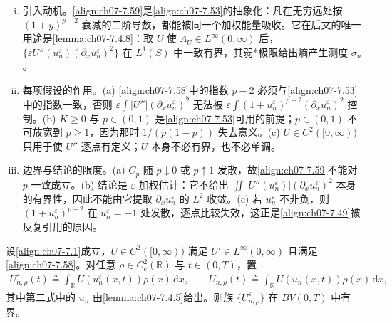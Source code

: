﻿\documentclass[../../main.tex]{subfiles}%
\begin{document}
\begin{remark}\label{remark:ch07-7.4.3能量}
\begin{enumerate}[(i)]
\item 引入动机。\eqref{align:ch07-7.59}是\eqref{align:ch07-7.53}的抽象化：凡在无穷远处按 $(1+y)^{p-2}$ 衰减的二阶导数，都能被同一个加权能量吸收。它在后文的唯一用途是\cref{lemma:ch07-7.4.8}：取 $U$ 使 $\Lambda_U\in L^\infty(0,\infty)$ 后，$\{\varepsilon U''(u_n^\varepsilon)(\partial_xu_n^\varepsilon)^2\}$ 在 $L^1(S)$ 中一致有界，其弱*极限给出熵产生测度 $\sigma_n$。
\item 每项假设的作用。(a) \eqref{align:ch07-7.58}中的指数 $p-2$ 必须与\eqref{align:ch07-7.53}中的指数一致，否则 $\varepsilon\int|U''|(\partial_xu_n^\varepsilon)^2$ 无法被 $\varepsilon\int(1+u_n^\varepsilon)^{p-2}(\partial_xu_n^\varepsilon)^2$ 控制。(b) $K\geqslant0$ 与 $p\in(0,1)$ 是\eqref{align:ch07-7.53}可用的前提；$p\in(0,1)$ 不可放宽到 $p\geqslant1$，因为那时 $1/(p(1-p))$ 失去意义。(c) $U\in C^2([0,\infty))$ 只用于使 $U''$ 逐点有定义；$U$ 本身不必有界，也不必单调。
\item 边界与结论的限度。(a) $C_p$ 随 $p\downarrow0$ 或 $p\uparrow1$ 发散，故\eqref{align:ch07-7.59}不能对 $p$ 一致成立。(b) 结论是 $\varepsilon$ 加权估计：它不给出 $\iint|U''(u_n^\varepsilon)|(\partial_xu_n^\varepsilon)^2$ 本身的有界性，因此不能由它提取 $\partial_xu_n^\varepsilon$ 的 $L^2$ 收敛。(c) 若 $u_n^\varepsilon$ 不非负，则 $(1+u_n^\varepsilon)^{p-2}$ 在 $u_n^\varepsilon=-1$ 处发散，逐点比较失效，这正是\eqref{align:ch07-7.49}被反复引用的原因。
\end{enumerate}
\end{remark}

\begin{lemma}\label{lemma:ch07-7.4.4}
设\eqref{align:ch07-7.1}成立，$U\in C^2([0,\infty))$ 满足 $U'\in L^\infty(0,\infty)$ 且满足\eqref{align:ch07-7.58}。对任意 $\rho\in C^2_c(\mathbb{R})$ 与 $t\in(0,T)$，置
\begin{align}
U_{n,\rho}^\varepsilon(t)\triangleq\int_{\mathbb{R}}U(u_n^\varepsilon(x,t))\rho(x)\,\mathrm{d}x,\qquad
U_{n,\rho}(t)\triangleq\int_{\mathbb{R}}U(u_n(x,t))\rho(x)\,\mathrm{d}x, \label{align:ch07-7.60}
\end{align}
其中第二式中的 $u_n$ 由\cref{lemma:ch07-7.4.5}给出。则族 $\{U_{n,\rho}^\varepsilon\}$ 在 $BV(0,T)$ 中有界。
\end{lemma}
\end{document}
